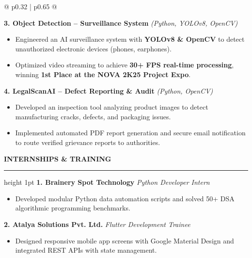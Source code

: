 \documentclass[a4paper,10pt]{article}
\begin{document}
\begin{mdframed}[style=resumebox]
\begin{tabularx}{\textwidth}{@{} p{0.32\textwidth} | p{0.65\textwidth} @{}}
\begin{minipage}[t]{\linewidth}
    \textbf{3. Object Detection -- Surveillance System} \hfill \textit{\footnotesize (Python, YOLOv8, OpenCV)}\\
    \begin{itemize}
        \item Engineered an AI surveillance system with \textbf{YOLOv8 \& OpenCV} to detect unauthorized electronic devices (phones, earphones).
        \item Optimized video streaming to achieve \textbf{30+ FPS real-time processing}, winning \textbf{1st Place at the NOVA 2K25 Project Expo}.
    \end{itemize}
    \vspace{2pt}\dotfill\vspace{2pt}

    \textbf{4. LegalScanAI -- Defect Reporting \& Audit} \hfill \textit{\footnotesize (Python, OpenCV)}\\
    \begin{itemize}
        \item Developed an inspection tool analyzing product images to detect manufacturing cracks, defects, and packaging issues.
        \item Implemented automated PDF report generation and secure email notification to route verified grievance reports to authorities.
    \end{itemize}

    \vspace{6pt}
    \textbf{\color{primaryblack}\large INTERNSHIPS \& TRAINING}
    \vspace{2pt}\hrule height 1pt\vspace{3pt}
    \textbf{1. Brainery Spot Technology} \hfill \textit{\footnotesize Python Developer Intern}\\
    \begin{itemize}
        \item Developed modular Python data automation scripts and solved 50+ DSA algorithmic programming benchmarks.
    \end{itemize}
    \vspace{2pt}\dotfill\vspace{2pt}
    \textbf{2. Atalya Solutions Pvt. Ltd.} \hfill \textit{\footnotesize Flutter Development Trainee}\\
    \begin{itemize}
        \item Designed responsive mobile app screens with Google Material Design and integrated REST APIs with state management.
    \end{itemize}


\end{minipage}
\end{tabularx}
\end{mdframed}
\end{document}
